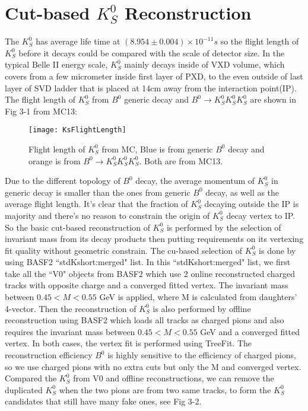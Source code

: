  \section{Cut-based $K_S^0$ Reconstruction}
 The $K_S^0$ has average life time at $(8.954 \pm 0.004) \times 10 ^{-11}s$ so the flight length of $K_S^0$ before it decays could be compared with the scale of detector size. In the typical Belle II energy scale, $K_S^0$ mainly decays inside of VXD volume, which covers from a few micrometer inside first layer of PXD, to the even outside of last layer of SVD ladder that is placed at 14cm away from the interaction point(IP). The flight length of $K_S^0$ from $B^0$ generic decay and $B^0 \to K_S^0  K_S^0  K_S^0 $ are shown in Fig 3-1 from MC13: 
 
 \begin{figure}[htpb]
 	\centering 
 	\texttt{[image: KsFlightLength]}
 	\caption{Flight length of $K_S^0$ from MC, Blue is from generic $B^0$ decay and  orange is from $B^0 \to K_S^0  K_S^0  K_S^0$. Both are from MC13.}
 \end{figure}
 
 Due to the different topology of $B^0$ decay, the average momentum of $K_S^0$ in generic decay is smaller than the ones from generic $B^0$ decay, as well as the average flight length. It's clear that the fraction of $K_S^0$ decaying outside the IP is majority and there's no reason to constrain the origin of $K_S^0$ decay vertex to IP. So the basic cut-based reconstruction of $K_S^0$ is performed by the selection of invariant mass from its decay products then putting requirements on its vertexing fit quality without geometric constrain. The cu-based selection of $K_S^0$ is done by using BASF2 ``stdKshort:merged" list. In this ``stdKshort:merged" list, we first take all the ``V0" objects from BASF2 which use 2 online reconstructed charged tracks with opposite charge and a converged fitted vertex. The invariant mass between $0.45 < M < 0.55$ GeV is applied, where M is calculated from daughters' 4-vector. Then the reconstruction of $K_S^0$ is also performed by offline reconstruction using BASF2 which loads all tracks as charged pions and also requires the invariant mass between $0.45 < M < 0.55$ GeV and a converged fitted vertex. In both cases, the vertex fit is performed using TreeFit. The reconstruction efficiency $B^0$ is highly sensitive to the efficiency of charged pions, so we use charged pions with no extra cuts but only the M and converged vertex. Compared the $K_S^0$ from V0 and offline reconstructions, we can remove the duplicated $K_S^0$ when the two pions are from two same tracks, to form the $K_S^0$ candidates that still have many fake ones, see Fig 3-2.
 
